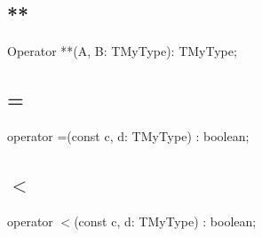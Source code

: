 \documentclass{report}
\begin{document}
\subsection*{**}
\begin{list}{}{
\setlength{\itemindent}{0cm}
\setlength{\listparindent}{0cm}
\setlength{\leftmargin}{\evensidemargin}
\addtolength{\leftmargin}{\tmplength}
\settowidth{\labelsep}{X}
\addtolength{\leftmargin}{\labelsep}
\setlength{\labelwidth}{\tmplength}
}
\begin{flushleft}
\item[\textbf{Declaration}\hfill]
\begin{ttfamily}
Operator **(A, B: TMyType): TMyType;\end{ttfamily}


\end{flushleft}
\end{list}
\subsection*{=}
\begin{list}{}{
\setlength{\itemindent}{0cm}
\setlength{\listparindent}{0cm}
\setlength{\leftmargin}{\evensidemargin}
\addtolength{\leftmargin}{\tmplength}
\settowidth{\labelsep}{X}
\addtolength{\leftmargin}{\labelsep}
\setlength{\labelwidth}{\tmplength}
}
\begin{flushleft}
\item[\textbf{Declaration}\hfill]
\begin{ttfamily}
operator =(const c, d: TMyType) : boolean;\end{ttfamily}


\end{flushleft}
\end{list}
\subsection*{{$<$}}
\begin{list}{}{
\setlength{\itemindent}{0cm}
\setlength{\listparindent}{0cm}
\setlength{\leftmargin}{\evensidemargin}
\addtolength{\leftmargin}{\tmplength}
\settowidth{\labelsep}{X}
\addtolength{\leftmargin}{\labelsep}
\setlength{\labelwidth}{\tmplength}
}
\begin{flushleft}
\item[\textbf{Declaration}\hfill]
\begin{ttfamily}
operator {$<$}(const c, d: TMyType) : boolean;\end{ttfamily}


\end{flushleft}
\end{list}
\end{document}
